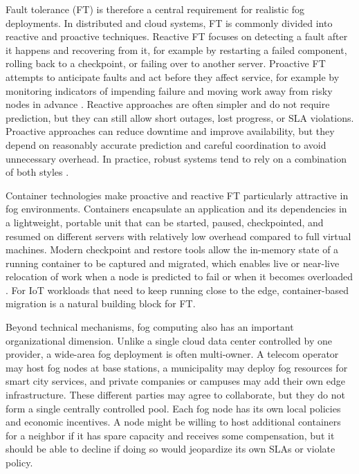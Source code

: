 \documentclass{article}
\begin{document}
Fault tolerance (FT) is therefore a central requirement for realistic fog deployments. In distributed and cloud systems, FT is commonly divided into reactive and proactive techniques. Reactive FT focuses on detecting a fault after it happens and recovering from it, for example by restarting a failed component, rolling back to a checkpoint, or failing over to another server. Proactive FT attempts to anticipate faults and act before they affect service, for example by monitoring indicators of impending failure and moving work away from risky nodes in advance \cite{shahidResilientMethodExhaustive2021}. Reactive approaches are often simpler and do not require prediction, but they can still allow short outages, lost progress, or SLA violations. Proactive approaches can reduce downtime and improve availability, but they depend on reasonably accurate prediction and careful coordination to avoid unnecessary overhead. In practice, robust systems tend to rely on a combination of both styles \cite{hasanProactiveFaultTolerance2024}.


Container technologies make proactive and reactive FT particularly attractive in fog environments. Containers encapsulate an application and its dependencies in a lightweight, portable unit that can be started, paused, checkpointed, and resumed on different servers with relatively low overhead compared to full virtual machines. Modern checkpoint and restore tools allow the in-memory state of a running container to be captured and migrated, which enables live or near-live relocation of work when a node is predicted to fail or when it becomes overloaded \cite{chengFogFunctionServerless2019}. For IoT workloads that need to keep running close to the edge, container-based migration is a natural building block for FT.


Beyond technical mechanisms, fog computing also has an important organizational dimension. Unlike a single cloud data center controlled by one provider, a wide-area fog deployment is often multi-owner. A telecom operator may host fog nodes at base stations, a municipality may deploy fog resources for smart city services, and private companies or campuses may add their own edge infrastructure. These different parties may agree to collaborate, but they do not form a single centrally controlled pool. Each fog node has its own local policies and economic incentives. A node might be willing to host additional containers for a neighbor if it has spare capacity and receives some compensation, but it should be able to decline if doing so would jeopardize its own SLAs or violate policy.
\end{document}
